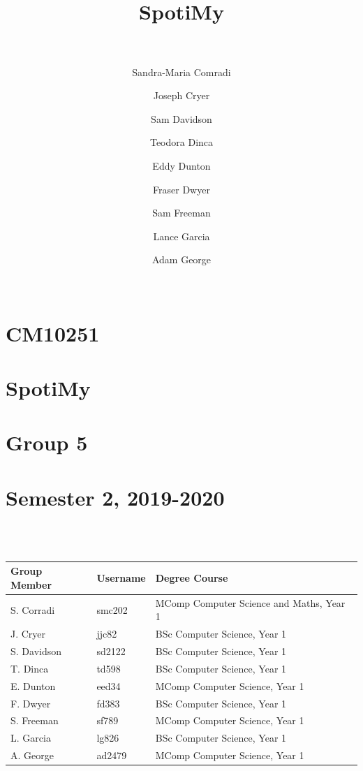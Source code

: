 \documentclass[10pt, notitlepage]{report}
\title{\leavevmode \\\leavevmode \\SpotiMy\\\leavevmode \\}
\author{
	Sandra-Maria Comradi
	\and
	Joseph Cryer
	\and
	Sam Davidson
	\and
	Teodora Dinca
	\and
	Eddy Dunton
	\and
	Fraser Dwyer
	\and
	Sam Freeman
	\and
	Lance Garcia
	\and
	Adam George\\\leavevmode \\
}
\begin{document}
\pagebreak
\hspace{0pt}
\vfill

\thispagestyle{empty}
\section*{\centering CM10251}
\section*{\centering SpotiMy}
\section*{\centering Group 5}
\section*{\centering Semester 2,  2019-2020}

\leavevmode \\
\leavevmode \\
\begin{table}[h]
\centering
\begin{tabular}{p{4cm} p{3cm} p{8cm}}
\textbf{Group Member}&\textbf{Username}&\textbf{Degree Course}\\
\hline
S. Corradi&smc202&MComp Computer Science and Maths, Year 1\\
J. Cryer&jjc82&BSc Computer Science, Year 1\\
S. Davidson&sd2122&BSc Computer Science, Year 1\\
T. Dinca&td598&BSc Computer Science, Year 1\\
E. Dunton&eed34&MComp Computer Science, Year 1\\
F. Dwyer&fd383&BSc Computer Science, Year 1\\
S. Freeman&sf789&MComp Computer Science, Year 1\\
L. Garcia&lg826&BSc Computer Science, Year 1\\
A. George&ad2479&MComp Computer Science, Year 1\\

\end{tabular}
\end{table}

\vfill
\hspace{0pt}
\pagebreak
\end{document}
